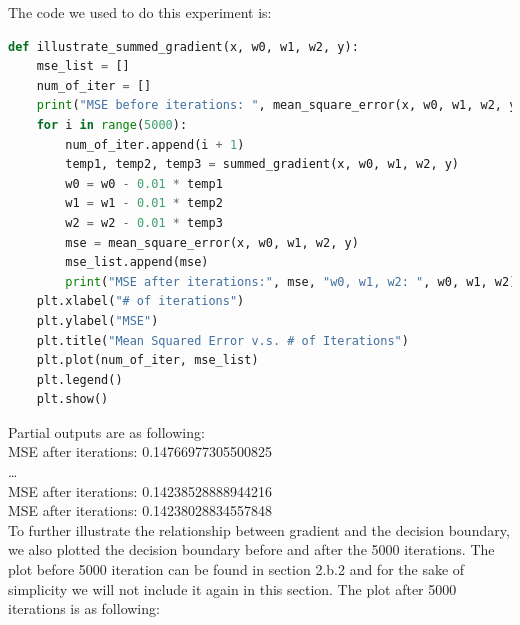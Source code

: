 \documentclass[12pt]{article}
\begin{document}
\noindent The code we used to do this experiment is:
\begin{lstlisting}[language=Python, caption=Illustrate the Change of Gradient's Impact on MSE]
def illustrate_summed_gradient(x, w0, w1, w2, y): 
    mse_list = []
    num_of_iter = []
    print("MSE before iterations: ", mean_square_error(x, w0, w1, w2, y), "w0, w1, w2: ", w0, w1, w2)
    for i in range(5000): 
        num_of_iter.append(i + 1)
        temp1, temp2, temp3 = summed_gradient(x, w0, w1, w2, y)
        w0 = w0 - 0.01 * temp1
        w1 = w1 - 0.01 * temp2
        w2 = w2 - 0.01 * temp3
        mse = mean_square_error(x, w0, w1, w2, y)
        mse_list.append(mse)
        print("MSE after iterations:", mse, "w0, w1, w2: ", w0, w1, w2)
    plt.xlabel("# of iterations")
    plt.ylabel("MSE")
    plt.title("Mean Squared Error v.s. # of Iterations")
    plt.plot(num_of_iter, mse_list)
    plt.legend()
    plt.show()
\end{lstlisting}

\noindent Partial outputs are as following: \\
MSE after iterations: 0.14766977305500825 \\
\dots \\
MSE after iterations: 0.14238528888944216 \\
MSE after iterations: 0.14238028834557848 \\

\noindent To further illustrate the relationship between gradient and the decision boundary, we also plotted the decision boundary before and after the 5000 iterations. 
The plot before 5000 iteration can be found in section 2.b.2 and for the sake of simplicity we will not include it again in this section. The plot after 5000 
iterations is as following: 
\begin{center}
    
\end{center}
\end{document}
